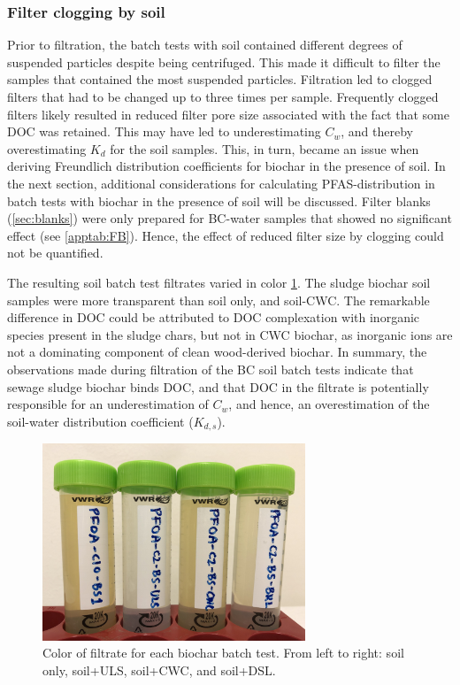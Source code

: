 \subsubsection{Filter clogging by soil}\label{sec:Soil}
Prior to filtration, the batch tests with soil contained different degrees of suspended particles despite being centrifuged. This made it difficult to filter the samples that contained the most suspended particles. Filtration led to clogged filters that had to be changed up to three times per sample. Frequently clogged filters likely resulted in reduced filter pore size associated with the fact that some DOC was retained. This may have led to underestimating $C_w$, and thereby overestimating $K_d$ for the soil samples. This, in turn, became an issue when deriving Freundlich distribution coefficients for biochar in the presence of soil. In the next section, additional considerations for calculating PFAS-distribution in batch tests with biochar in the presence of soil will be discussed. Filter blanks (\cref{sec:blanks}) were only prepared for BC-water samples that showed no significant effect (see \cref{apptab:FB}). Hence, the effect of reduced filter size by clogging could not be quantified. 

The resulting soil batch test filtrates varied in color \cref{fig:DOC}. The sludge biochar soil samples were more transparent than soil only, and soil-CWC. The remarkable difference in DOC could be attributed to DOC complexation with inorganic species present in the sludge chars, but not in CWC biochar, as inorganic ions are not a dominating component of clean wood-derived biochar. In summary, the observations made during filtration of the BC soil batch tests indicate that sewage sludge biochar binds DOC, and that DOC in the filtrate is potentially responsible for an underestimation of $C_w$, and hence, an overestimation of the soil-water distribution coefficient ($K_{d,s}$). 

\begin{figure}
    \centering
    \includegraphics[width=0.7\textwidth]{Bilder/Samples/Filtrate_DOC.JPG}
    \caption{Color of filtrate for each biochar batch test. From left to right: soil only, soil+ULS, soil+CWC, and soil+DSL.}
    \label{fig:DOC}
\end{figure}

